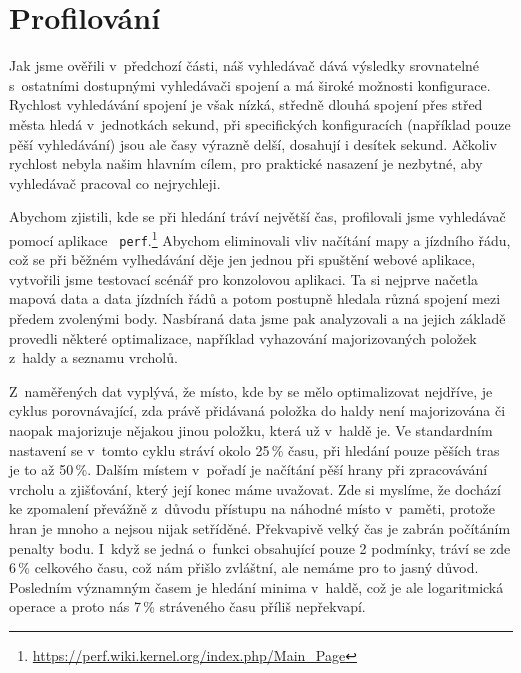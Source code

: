 \section{Profilování}
Jak jsme ověřili v~předchozí části, náš vyhledávač dává výsledky srovnatelné
s~ostatními dostupnými vyhledávači spojení a má široké možnosti konfigurace.
Rychlost vyhledávání spojení je však nízká, středně dlouhá spojení přes střed
města hledá v~jednotkách sekund, při specifických konfiguracích (například pouze
pěší vyhledávání) jsou ale časy výrazně delší, dosahují i desítek sekund.
Ačkoliv rychlost nebyla našim hlavním cílem, pro praktické nasazení je nezbytné,
aby vyhledávač pracoval co nejrychleji. 

Abychom zjistili, kde se při hledání tráví největší čas, profilovali jsme
vyhledávač pomocí aplikace {\tt
perf}.\footnote{\url{https://perf.wiki.kernel.org/index.php/Main_Page}} Abychom eliminovali vliv načítání mapy a
jízdního řádu, což se při běžném vylhedávání děje jen jednou při spuštění webové
aplikace, vytvořili jsme testovací scénář pro konzolovou aplikaci. Ta si nejprve
načetla mapová data a data jízdních řádů a potom postupně hledala různá spojení
mezi předem zvolenými body. Nasbíraná data jsme pak analyzovali a na jejich
základě provedli některé optimalizace, například vyhazování majorizovaných
položek z~haldy a seznamu vrcholů.

Z~naměřených dat vyplývá, že místo, kde by se mělo optimalizovat nejdříve, je
cyklus porovnávající, zda právě přidávaná položka do haldy není majorizována či
naopak majorizuje nějakou jinou položku, která už v~haldě je. Ve standardním
nastavení se v~tomto cyklu stráví okolo 25\,\% času, při hledání pouze pěších
tras je to až 50\,\%. Dalším místem v~pořadí je načítání pěší hrany při
zpracovávání vrcholu a zjišťování, který její konec máme uvažovat. Zde si
myslíme, že dochází ke zpomalení převážně z~důvodu přístupu na náhodné místo
v~paměti, protože hran je mnoho a nejsou nijak setříděné. Překvapivě velký čas je
zabrán počítáním penalty bodu. I~když se jedná o~funkci obsahující pouze 2
podmínky, tráví se zde 6\,\% celkového času, což nám přišlo zvláštní, ale nemáme
pro to jasný důvod. Posledním významným časem je hledání minima v~haldě, což je
ale logaritmická operace a proto nás 7\,\% stráveného času příliš nepřekvapí.


